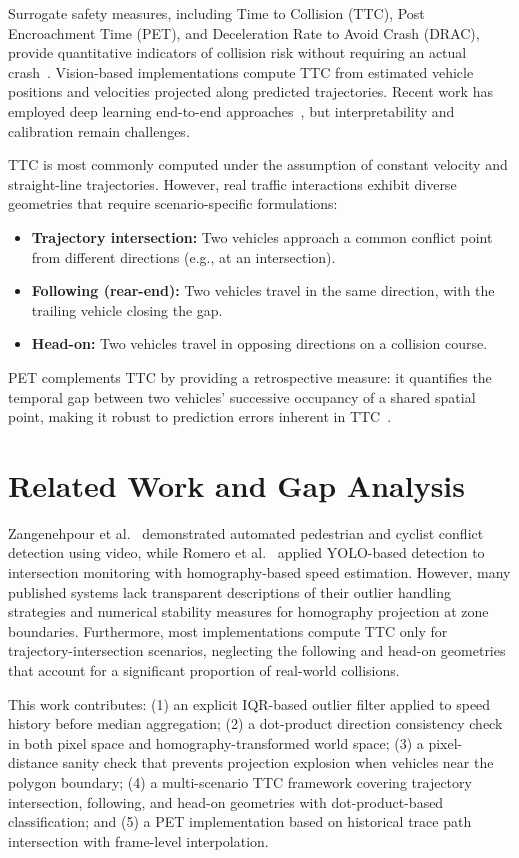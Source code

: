 \documentclass[12pt]{report}
\begin{document}
Surrogate safety measures, including Time to Collision (TTC), Post Encroachment Time (PET), and Deceleration Rate to Avoid Crash (DRAC), provide quantitative indicators of collision risk without requiring an actual crash~\cite{Tarko2009}.
Vision-based implementations compute TTC from estimated vehicle positions and velocities projected along predicted trajectories.
Recent work has employed deep learning end-to-end approaches~\cite{Chan2016}, but interpretability and calibration remain challenges.

TTC is most commonly computed under the assumption of constant velocity and straight-line trajectories.
However, real traffic interactions exhibit diverse geometries that require scenario-specific formulations:
\begin{itemize}
    \item \textbf{Trajectory intersection:} Two vehicles approach a common conflict point from different directions (e.g., at an intersection).
    \item \textbf{Following (rear-end):} Two vehicles travel in the same direction, with the trailing vehicle closing the gap.
    \item \textbf{Head-on:} Two vehicles travel in opposing directions on a collision course.
\end{itemize}

PET complements TTC by providing a retrospective measure: it quantifies the temporal gap between two vehicles' successive occupancy of a shared spatial point, making it robust to prediction errors inherent in TTC~\cite{Tarko2009}.

\section{Related Work and Gap Analysis}

Zangenehpour et al.~\cite{Zangenehpour2015} demonstrated automated pedestrian and cyclist conflict detection using video, while Romero et al.~\cite{Romero2020} applied YOLO-based detection to intersection monitoring with homography-based speed estimation.
However, many published systems lack transparent descriptions of their outlier handling strategies and numerical stability measures for homography projection at zone boundaries.
Furthermore, most implementations compute TTC only for trajectory-intersection scenarios, neglecting the following and head-on geometries that account for a significant proportion of real-world collisions.

This work contributes: (1) an explicit IQR-based outlier filter applied to speed history before median aggregation; (2) a dot-product direction consistency check in both pixel space and homography-transformed world space; (3) a pixel-distance sanity check that prevents projection explosion when vehicles near the polygon boundary; (4) a multi-scenario TTC framework covering trajectory intersection, following, and head-on geometries with dot-product-based classification; and (5) a PET implementation based on historical trace path intersection with frame-level interpolation.
\end{document}
